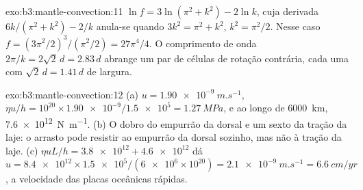 \begin{solution}{exo:b3:mantle-convection:11}
$\ln f = 3\ln(\pi^2 + k^2) - 2\ln k$, cuja derivada $6k/(\pi^2 + k^2) - 2/k$
anula-se quando $3k^2 = \pi^2 + k^2$, $k^2 = \pi^2/2$. Nesse caso $f = (3\pi^2/2)^3/
(\pi^2/2) = 27\pi^4/4$. O comprimento de onda $2\pi/k = 2\sqrt2\,d = 2.83\,d$ abrange um
par de células de rotação contrária, cada uma com $\sqrt2\,d = 1.41\,d$ de largura.
\end{solution}

\begin{solution}{exo:b3:mantle-convection:12}
(a) $u = \qty{1.90e-9}{m.s^{-1}}$, $\eta u/h = 10^{20}\times\num{1.90e-9}/
\num{1.5e5} = \qty{1.27}{MPa}$, e ao longo de \qty{6000}{km}, \qty{7.6e12}{N.m^{-1}}.
(b) O dobro do empurrão da dorsal e um sexto da tração da laje: o arrasto pode resistir
ao empurrão da dorsal sozinho, mas não à tração da laje. (c) $\eta uL/h = \num{3.8e12} +
\num{4.6e12}$ dá $u = \num{8.4e12}\times\num{1.5e5}/(\num{6e6}\times10^{20})
= \qty{2.1e-9}{m.s^{-1}} = \qty{6.6}{cm/yr}$, a velocidade das placas oceânicas
rápidas.
\end{solution}

